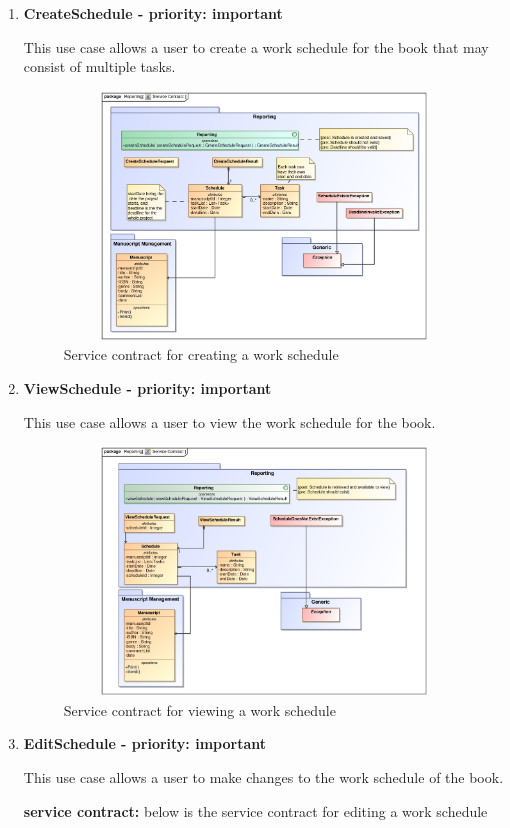 \documentclass[12pt]{article}
\begin{document}
\begin{enumerate}
\item \textbf{CreateSchedule - priority: important}
\par{This use case allows a user to create a work schedule for the book that may consist of multiple tasks.}

\begin{figure}[h]
\includegraphics[height=250px, width=500px]{epsImages/Reporting/createSchedule.eps}
\caption{Service contract for creating a work schedule}
\end{figure}

\item \textbf{ViewSchedule - priority: important}
\par{This use case allows a user to view the work schedule for the book.}

\begin{figure}[h]
\includegraphics[height=250px, width=500px]{epsImages/Reporting/viewSchedule.eps}
\caption{Service contract for viewing a work schedule}
\end{figure}

\item \textbf{EditSchedule - priority: important}\\
\par{This use case allows a user to make changes to the work schedule of the book.}
\par{\textbf{service contract:} below is the service contract for editing a work schedule}


\end{enumerate}
\end{document}
